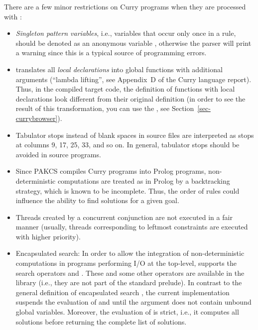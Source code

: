 There are a few minor restrictions on Curry programs
when they are processed with \CYS:
\begin{itemize}
\item
{}
\emph{Singleton pattern variables}, i.e., variables that occur only once
in a rule, should be denoted as an anonymous variable \ccode{_},
otherwise the parser will print a warning since this is a
typical source of programming errors.
\item
\CYS translates all \emph{local declarations} into global functions with
additional arguments (``lambda lifting'', see Appendix~D of the
Curry language report).
Thus, in the compiled target code, the definition of
functions with local declarations look different from
their original definition (in order to see the result
of this transformation, you can use the \cb, see
Section~\ref{sec-currybrowser}).
\item {}
Tabulator stops instead of blank spaces in source files are
interpreted as stops at columns 9, 17, 25, 33, and so on.
In general, tabulator stops should be avoided in source programs.
\item
Since PAKCS compiles Curry programs into Prolog programs,
non-deterministic computations are treated as in Prolog
by a backtracking strategy, which is known to be incomplete.
Thus, the order of rules could influence the ability
to find solutions for a given goal.
\item
Threads created by a concurrent conjunction are not executed
in a fair manner (usually, threads corresponding to leftmost constraints
are executed with higher priority).
\item
Encapsulated search: In order
to allow the integration of non-deterministic computations
in programs performing I/O at the top-level, \CYS supports
the search operators 
and .
These and some other operators are available in the
library  (i.e., they are not part of the standard prelude).
In contrast to the general definition of encapsulated search
\cite{HanusSteiner98PLILP}, the current implementation suspends
the evaluation of  and 
until the argument does not contain unbound global variables.
Moreover, the evaluation of  is strict,
i.e., it computes all solutions before returning the
complete list of solutions.


\end{itemize}
